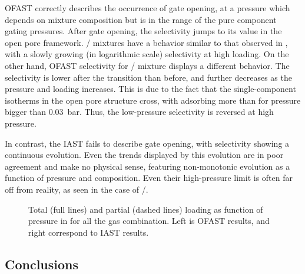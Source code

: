 \documentclass[thesis]{subfiles}
\begin{document}
OFAST correctly describes the occurrence of gate opening, at a pressure which
depends on mixture composition but is in the range of the pure component gating
pressures. After gate opening, the selectivity jumps to its value in the open
pore framework. / mixtures have a behavior similar to that
observed in \Cudhbc, with a slowly growing (in logarithmic scale) selectivity at
high loading. On the other hand, OFAST selectivity for /
mixture displays a different behavior. The selectivity is lower after the
transition than before, and further decreases as the pressure and loading
increases. This is due to the fact that the single-component isotherms  in the
open pore structure cross, with  adsorbing more than  for
pressure bigger than \SI{0.03}{bar}. Thus, the low-pressure selectivity is
reversed at high pressure.

In contrast, the IAST fails to describe gate opening, with selectivity showing a
continuous evolution. Even the trends displayed by this evolution are in poor
agreement and make no physical sense, featuring non-monotonic evolution as a
function of pressure and composition. Even their high-pressure limit is often
far off from reality, as seen in the case of /.

\begin{figure}[htp]
    \centering
    
    \caption{Total (full lines) and partial (dashed lines) loading as function
    of pressure in \RPMZn for all the gas combination. Left is OFAST results,
    and right correspond to IAST results.}
    \label{fig:rpm3-zn:iast-ofast:loadings}
\end{figure}

\FloatBarrier
\subsection{Conclusions}
\end{document}
